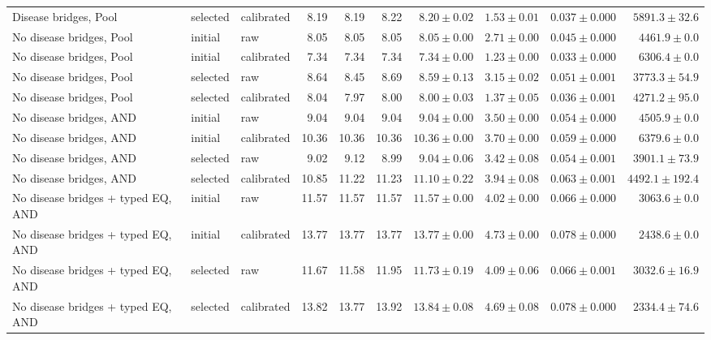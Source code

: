 \begin{landscape}
\begin{table}[p]
\begin{adjustbox}{max width=\linewidth}
\begin{tabular}{lllrrrrrrr}
Disease bridges, Pool & selected & calibrated & 8.19 & 8.19 & 8.22 & $8.20\pm 0.02$ & $1.53\pm 0.01$ & $0.037\pm 0.000$ & $5891.3\pm 32.6$ \\
No disease bridges, Pool & initial & raw & 8.05 & 8.05 & 8.05 & $8.05\pm 0.00$ & $2.71\pm 0.00$ & $0.045\pm 0.000$ & $4461.9\pm 0.0$ \\
No disease bridges, Pool & initial & calibrated & 7.34 & 7.34 & 7.34 & $7.34\pm 0.00$ & $1.23\pm 0.00$ & $0.033\pm 0.000$ & $6306.4\pm 0.0$ \\
No disease bridges, Pool & selected & raw & 8.64 & 8.45 & 8.69 & $8.59\pm 0.13$ & $3.15\pm 0.02$ & $0.051\pm 0.001$ & $3773.3\pm 54.9$ \\
No disease bridges, Pool & selected & calibrated & 8.04 & 7.97 & 8.00 & $8.00\pm 0.03$ & $1.37\pm 0.05$ & $0.036\pm 0.001$ & $4271.2\pm 95.0$ \\
No disease bridges, AND & initial & raw & 9.04 & 9.04 & 9.04 & $9.04\pm 0.00$ & $3.50\pm 0.00$ & $0.054\pm 0.000$ & $4505.9\pm 0.0$ \\
No disease bridges, AND & initial & calibrated & 10.36 & 10.36 & 10.36 & $10.36\pm 0.00$ & $3.70\pm 0.00$ & $0.059\pm 0.000$ & $6379.6\pm 0.0$ \\
No disease bridges, AND & selected & raw & 9.02 & 9.12 & 8.99 & $9.04\pm 0.06$ & $3.42\pm 0.08$ & $0.054\pm 0.001$ & $3901.1\pm 73.9$ \\
No disease bridges, AND & selected & calibrated & 10.85 & 11.22 & 11.23 & $11.10\pm 0.22$ & $3.94\pm 0.08$ & $0.063\pm 0.001$ & $4492.1\pm 192.4$ \\
No disease bridges + typed EQ, AND & initial & raw & 11.57 & 11.57 & 11.57 & $11.57\pm 0.00$ & $4.02\pm 0.00$ & $0.066\pm 0.000$ & $3063.6\pm 0.0$ \\
No disease bridges + typed EQ, AND & initial & calibrated & 13.77 & 13.77 & 13.77 & $13.77\pm 0.00$ & $4.73\pm 0.00$ & $0.078\pm 0.000$ & $2438.6\pm 0.0$ \\
No disease bridges + typed EQ, AND & selected & raw & 11.67 & 11.58 & 11.95 & $11.73\pm 0.19$ & $4.09\pm 0.06$ & $0.066\pm 0.001$ & $3032.6\pm 16.9$ \\
No disease bridges + typed EQ, AND & selected & calibrated & 13.82 & 13.77 & 13.92 & $13.84\pm 0.08$ & $4.69\pm 0.08$ & $0.078\pm 0.000$ & $2334.4\pm 74.6$ \\
\bottomrule
\end{tabular}
\end{adjustbox}
\end{table}
\clearpage
\end{landscape}
